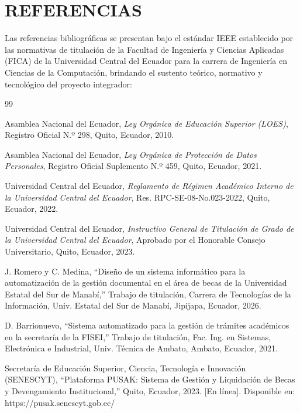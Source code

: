 
\section{REFERENCIAS}

Las referencias bibliográficas se presentan bajo el estándar IEEE establecido por las normativas de titulación de la Facultad de Ingeniería y Ciencias Aplicadas (FICA) de la Universidad Central del Ecuador para la carrera de Ingeniería en Ciencias de la Computación, brindando el sustento teórico, normativo y tecnológico del proyecto integrador:

\begin{thebibliography}{99}

Asamblea Nacional del Ecuador, \textit{Ley Orgánica de Educación Superior (LOES)}, Registro Oficial N.º 298, Quito, Ecuador, 2010.

Asamblea Nacional del Ecuador, \textit{Ley Orgánica de Protección de Datos Personales}, Registro Oficial Suplemento N.º 459, Quito, Ecuador, 2021.

Universidad Central del Ecuador, \textit{Reglamento de Régimen Académico Interno de la Universidad Central del Ecuador}, Res. RPC-SE-08-No.023-2022, Quito, Ecuador, 2022.

Universidad Central del Ecuador, \textit{Instructivo General de Titulación de Grado de la Universidad Central del Ecuador}, Aprobado por el Honorable Consejo Universitario, Quito, Ecuador, 2023.

J. Romero y C. Medina, ``Diseño de un sistema informático para la automatización de la gestión documental en el área de becas de la Universidad Estatal del Sur de Manabí,'' Trabajo de titulación, Carrera de Tecnologías de la Información, Univ. Estatal del Sur de Manabí, Jipijapa, Ecuador, 2026.

D. Barrionuevo, ``Sistema automatizado para la gestión de trámites académicos en la secretaría de la FISEI,'' Trabajo de titulación, Fac. Ing. en Sistemas, Electrónica e Industrial, Univ. Técnica de Ambato, Ambato, Ecuador, 2021.

Secretaría de Educación Superior, Ciencia, Tecnología e Innovación (SENESCYT), ``Plataforma PUSAK: Sistema de Gestión y Liquidación de Becas y Devengamiento Institucional,'' Quito, Ecuador, 2023. [En línea]. Disponible en: https://pusak.senescyt.gob.ec/


\end{thebibliography}
